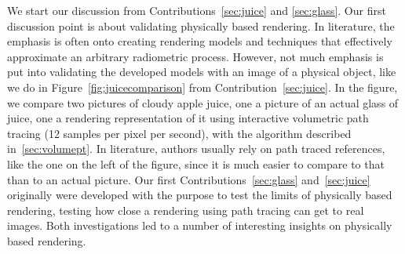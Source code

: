 We start our discussion from Contributions~\ref{sec:juice} and \ref{sec:glass}. Our first discussion point is about validating physically based rendering. In literature, the emphasis is often onto creating rendering models and techniques that effectively approximate an arbitrary radiometric process. However, not much emphasis is put into validating the developed models with an image of a physical object, like we do in Figure~\ref{fig:juicecomparison} from Contribution~\ref{sec:juice}. In the figure, we compare two pictures of cloudy apple juice, one a picture of an actual glass of juice, one a rendering representation of it using interactive volumetric path tracing (12 samples per pixel per second), with the algorithm described in~\ref{sec:volumept}. In literature, authors usually rely on path traced references, like the one on the left of the figure, since it is much easier to compare to that than to an actual picture. Our first Contributions~\ref{sec:glass} and~\ref{sec:juice} originally were developed with the purpose to test the limits of physically based rendering, testing how close a rendering using path tracing can get to real images. Both investigations led to a number of interesting insights on physically based rendering.

